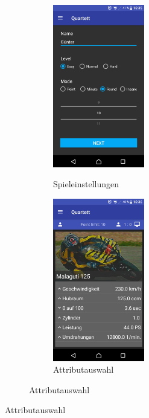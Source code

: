 \documentclass{scrartcl}
\begin{document}
\begin{figure}[!ht]
\begin{figure}[!ht]
\begin{figure}
  \centering
  \begin{minipage}{0.45\textwidth}
    \centering
    \includegraphics[width=4cm]{img/game_settings.png}
    \caption{Spieleinstellungen}
  \end{minipage}
  \hfill
  \begin{minipage}{0.45\textwidth}
    \centering
    \includegraphics[width=4cm]{img/game_attributes.png}
    \caption{Attributauswahl}
  \end{minipage}
\end{figure}


\end{figure}
\end{figure}
\end{document}
